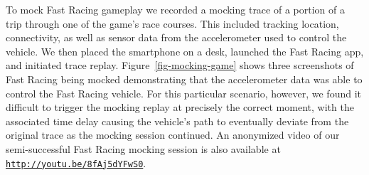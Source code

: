 To mock Fast Racing gameplay we recorded a mocking trace of a portion of a
trip through one of the game's race courses.  This included tracking location,
connectivity, as well as sensor data from the accelerometer used to control
the vehicle. We then placed the smartphone on a desk, launched the Fast
Racing app, and initiated trace replay. Figure~\ref{fig-mocking-game} shows
three screenshots of Fast Racing being mocked demonstrating that the
accelerometer data was able to control the Fast Racing vehicle. For this
particular scenario, however, we found it difficult to trigger the mocking
replay at precisely the correct moment, with the associated time delay
causing the vehicle's path to eventually deviate from the original trace as
the mocking session continued. An anonymized video of our semi-successful
Fast Racing mocking session is also available at
\hyperlink{http://youtu.be/8fAj5dYFwS0}{\texttt{http://youtu.be/8fAj5dYFwS0}}.

